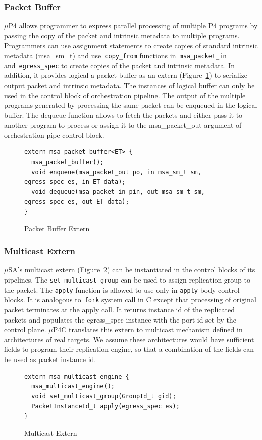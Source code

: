 \documentclass[10pt,sigconf,letterpaper,anonymous]{acmart}
\begin{document}
\subsubsection{Packet Buffer}
$\mu$P4 allows programmer to express parallel processing of multiple P4 programs by passing the copy of the packet and intrinsic metadata to multiple programs.
Programmers can use assignment statements to create copies of standard intrinsic metadata (msa\_sm\_t) and use~\texttt{copy\_from} functions in~\texttt{msa\_packet\_in} and~\texttt{egress\_spec} to create copies of the packet and intrinsic metadata.
In addition, it provides logical a packet buffer as an extern (Figure~\ref{fig:msa-packet-buffer-extern}) to serialize output packet and intrinsic metadata.
The instances of logical buffer can only be used in the control block of orchestration pipeline.
The output of the multiple programs generated by processing the same packet can be enqueued in the logical buffer.
The dequeue function allows to fetch the packets and either pass it to another program to process or assign it to the msa\_packet\_out argument of orchestration pipe control block.
\begin{figure}[!h]
\begin{lstlisting}[frame=none]
extern msa_packet_buffer<ET> {
  msa_packet_buffer();
  void enqueue(msa_packet_out po, in msa_sm_t sm, egress_spec es, in ET data);
  void dequeue(msa_packet_in pin, out msa_sm_t sm, egress_spec es, out ET data); 
}
\end{lstlisting}
\caption{Packet Buffer Extern}
\label{fig:msa-packet-buffer-extern}
\end{figure}

\subsubsection{Multicast Extern}
$\mu$SA's multicast extern (Figure~\ref{fig:msa-multicast-extern}) can be instantiated in the control blocks of its pipelines.
The \texttt{set\_multicast\_group} can be used to assign replication group to the packet. 
The \texttt{apply} function is allowed to use only in \texttt{apply} body control blocks. 
It is analogous to~\texttt{fork} system call in C except that processing of original packet terminates at the apply call.
It returns instance id of the replicated packets and populates the egress\_spec instance with the port id set by the control plane.
$\mu$P4C translates this extern to multicast mechanism defined in architectures of real targets.
We assume these architectures would have sufficient fields to program their replication engine, so that a combination of the fields can be used as packet instance id.
\begin{figure}[!h]
\begin{lstlisting}[frame=none]
extern msa_multicast_engine {
  msa_multicast_engine();
  void set_multicast_group(GroupId_t gid);
  PacketInstanceId_t apply(egress_spec es);
}
\end{lstlisting}
\caption{Multicast Extern}
\label{fig:msa-multicast-extern}
\end{figure}
\end{document}
